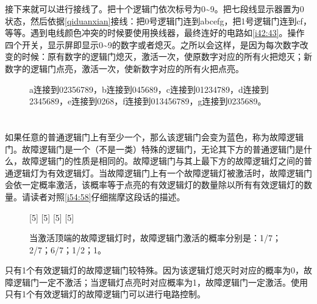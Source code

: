 接下来就可以进行接线了。把十个逻辑门依次标号为0\~{}9。把七段线显示器置为0状态，然后依据\autoref{qiduanxian}接线：把0号逻辑门连到abcefg，把1号逻辑门连到cf，等等。遇到电线颜色冲突的时候要使用换线器，最终连好的电路如\autoref{i42:43}。操作四个开关，显示屏即显示0\~{}9的数字或者熄灭。之所以会这样，是因为每次数字改变的时候：原有数字的逻辑门熄灭，激活一次，使原数字对应的所有火把熄灭；新数字的逻辑门点亮，激活一次，使新数字对应的所有火把点亮。

\begin{figure}[!ht]
\centering
{}

\caption{a连接到02356789，b连接到045689，c连接到01234789，d连接到2345689，e连接到0268，f连接到013456789，g连接到0235689。}
\label{i42:43}
\end{figure}

\section{}

如果任意的普通逻辑门上有至少一个，那么该逻辑门会变为蓝色，称为故障逻辑门。故障逻辑门是一个（不是一类）特殊的逻辑门，无论其下方的普通逻辑门是什么，故障逻辑门的性质是相同的。故障逻辑门与其上最下方的故障逻辑灯之间的普通逻辑灯为有效逻辑灯。当故障逻辑门上有一个故障逻辑灯被激活时，故障逻辑门会依一定概率激活，该概率等于点亮的有效逻辑灯的数量除以所有有效逻辑灯的数量。请读者对照\autoref{i54:58}仔细揣摩这段话的描述。

\begin{figure}[!ht]
\centering
{}%
[5]%
%
[5]%
%
[5]%
%
[5]%
\caption{当激活顶端的故障逻辑灯时，故障逻辑门激活的概率分别是：\protect{}1/7；\protect{}2/7；\protect{}6/7；\protect{}1/2；\protect{}1。}
\label{i54:58}
\end{figure}

只有1个有效逻辑灯的故障逻辑门较特殊。因为该逻辑灯熄灭时对应的概率为0，故障逻辑门一定不激活；当逻辑灯点亮时对应概率为1，故障逻辑门一定激活。使用只有1个有效逻辑灯的故障逻辑门可以进行电路控制。

